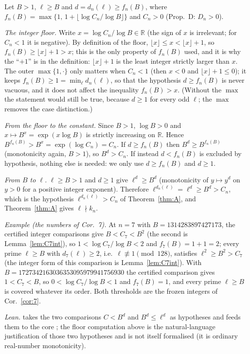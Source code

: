 Let $B>1$, $\ell\ge B$ and $d=d_n(\ell)\ge f_n(B)$, where $f_n(B)=\max\{1,\,1+\lfloor\log C_n/\log B\rfloor\}$ and $C_n>0$ (Prop.~D: $D_n>0$).

\emph{The integer floor.} Write $x=\log C_n/\log B\in\mathbb R$ (the sign of $x$ is irrelevant; for $C_n<1$ it is negative). By definition of the floor, $\lfloor x\rfloor\le x<\lfloor x\rfloor+1$, so $f_n(B)\ge\lfloor x\rfloor+1>x$; this is the only property of $f_n(B)$ used, and it is why the ``$+1$'' is in the definition: $\lfloor x\rfloor+1$ is the least integer strictly larger than $x$. The outer $\max\{1,\cdot\}$ only matters when $C_n<1$ (then $x<0$ and $\lfloor x\rfloor+1\le0$); it keeps $f_n(B)\ge1=\min_\ell d_n(\ell)$, so that the hypothesis $d\ge f_n(B)$ is never vacuous, and it does not affect the inequality $f_n(B)>x$. (Without the $\max$ the statement would still be true, because $d\ge1$ for every odd $\ell$; the $\max$ removes the case distinction.)

\emph{From the floor to the constant.} Since $B>1$, $\log B>0$ and $x\mapsto B^x=\exp(x\log B)$ is strictly increasing on $\mathbb R$. Hence $B^{f_n(B)}>B^{x}=\exp(\log C_n)=C_n$. If $d\ge f_n(B)$ then $B^d\ge B^{f_n(B)}$ (monotonicity again, $B>1$), so $B^d>C_n$. If instead $d<f_n(B)$ is excluded by hypothesis, nothing else is needed: we only use $d\ge f_n(B)$ and $d\ge1$.

\emph{From $B$ to $\ell$.} $\ell\ge B>1$ and $d\ge1$ give $\ell^d\ge B^d$ (monotonicity of $y\mapsto y^d$ on $y>0$ for a positive integer exponent). Therefore $\ell^{d_n(\ell)}=\ell^d\ge B^d>C_n$, which is the hypothesis $\ell^{d_n(\ell)}>C_n$ of Theorem~\ref{thm:A}, and Theorem~\ref{thm:A} gives $\ell\nmid k_n$.

\emph{Example (the numbers of Cor.~7).} At $n=7$ with $B=1314283897427173$, the certified integer comparisons give $B<C_7<B^2$ (the second is Lemma~\ref{lem:C7int}), so $1<\log C_7/\log B<2$ and $f_7(B)=1+1=2$; every prime $\ell\ge B$ with $d_7(\ell)\ge2$, i.e.\ $\ell\not\equiv1\pmod{128}$, satisfies $\ell^2\ge B^2>C_7$ (the integer form of this comparison is Lemma~\ref{lem:C7int}). With $B=1727342163036353095979941756930$ the certified comparison gives $1<C_7<B$, so $0<\log C_7/\log B<1$ and $f_7(B)=1$, and every prime $\ell\ge B$ is covered whatever its order. Both thresholds are the frozen integers of Cor.~\ref{cor:7}.

\emph{Lean.}  takes the two comparisons $C<B^d$ and $B^d\le\ell^d$ as hypotheses and feeds them to the core ; the floor computation above is the natural-language justification of those two hypotheses and is not itself formalised (it is ordinary real-number monotonicity).
